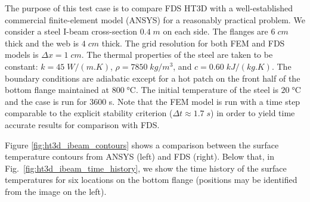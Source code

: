 \documentclass[11pt]{book}
\begin{document}
The purpose of this test case is to compare FDS HT3D with a well-established commercial finite-element model (ANSYS) for a reasonably practical problem.  We consider a steel I-beam cross-section $0.4 \;\si{m}$ on each side.  The flanges are $6 \;\si{cm}$ thick and the web is $4 \;\si{cm}$ thick.  The grid resolution for both FEM and FDS models is $\Delta x = 1 \;\si{cm}$.  The thermal properties of the steel are taken to be constant: $k=45 \;\si{W/(m.K)}$, $\rho=7850 \;\si{kg/m^3}$, and $c = 0.60 \;\si{kJ/(kg.K)}$.  The boundary conditions are adiabatic except for a hot patch on the front half of the bottom flange maintained at $800 \;\si{\degreeCelsius}$.  The initial temperature of the steel is $20 \;\si{\degreeCelsius}$ and the case is run for 3600 s.  Note that the FEM model is run with a time step comparable to the explicit stability criterion ($\Delta t \approx 1.7 \;\si{s}$) in order to yield time accurate results for comparison with FDS.

Figure \ref{fig:ht3d_ibeam_contours} shows a comparison between the surface temperature contours from ANSYS (left) and FDS (right).  Below that, in Fig.~\ref{fig:ht3d_ibeam_time_history}, we show the time history of the surface temperatures for six locations on the bottom flange (positions may be identified from the image on the left).
\end{document}
